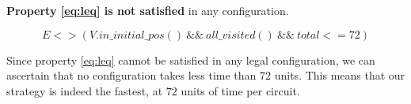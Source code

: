 \documentclass{article}
\begin{document}
\textbf{Property \ref{eq:leq} is not satisfied} in any configuration.


\begin{equation}
	\label{eq:leq}
	E<>(V.in\_initial\_pos() ~ \&\& ~ all\_visited() ~ \&\& ~ total <=  72)
\end{equation}

Since property \ref{eq:leq} cannot be satisfied in any legal configuration, we can ascertain that no configuration takes less time than $72$ units.
This means that our strategy is indeed the fastest, at $72$ units of time per circuit.

\end{document}
